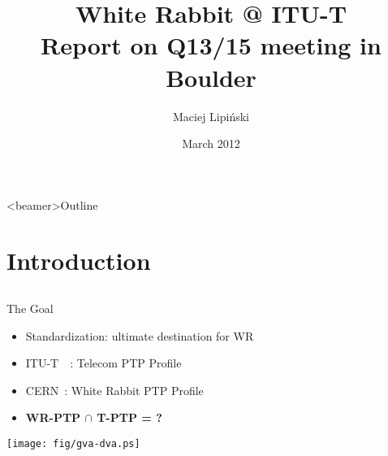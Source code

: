 \documentclass[compress,red]{beamer}
\title[ITU-T Q13/15 meeting report\hspace{2em}\insertframenumber/\inserttotalframenumber]
{White Rabbit @ ITU-T\\ Report on Q13/15 meeting in Boulder}
\institute{
   \begin{center}
    Hardware and Timing Section\\
    CERN
   \end{center}
}
\author{
Maciej Lipi\'{n}ski %
}
\date{March 2012}
\begin{document}
\frame{\titlepage}
\begin{frame}<beamer>{Outline}

    \tableofcontents %

\end{frame}
\section{Introduction}
\subsection{}
\begin{frame}{The Goal}
  
  \begin{itemize}
    \item Standardization: ultimate destination for WR
    \item ITU-T~~: Telecom PTP Profile 
    \item CERN~: White Rabbit PTP Profile 
    \item {\bf WR-PTP $\cap$ T-PTP = ?} 
  \end{itemize}

    \begin{center}
    \texttt{[image: fig/gva-dva.ps]}
    \end{center}


\end{frame}
\end{document}
